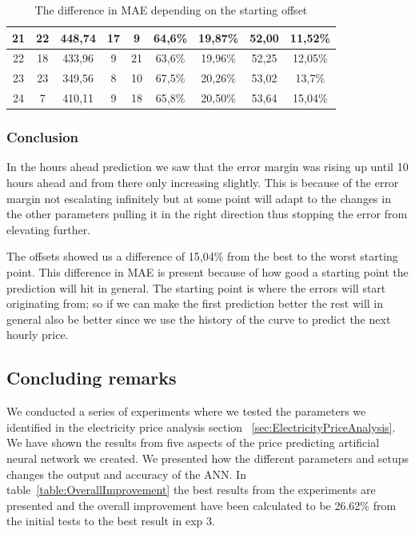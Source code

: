 \begin{table}[H]
{\begin{tabular}{|c|c|c|c|c|c|c|c|c|}
	21 & 22  & 448,74 & 17 & 9  & 64,6\% & 19,87\% & 52,00 & 11,52\% \\ \hline
	22 & 18  & 433,96 & 9  & 21 & 63,6\% & 19,96\% & 52,25 & 12,05\% \\ \hline
	23 & 23  & 349,56 & 8  & 10 & 67,5\% & 20,26\% & 53,02 & 13,7\% \\ \hline
	24 & 7   & 410,11 & 9  & 18 & 65,8\% & 20,50\% & 53,64 & 15,04\% \\ \hline
	\end{tabular}
}
\caption{The difference in MAE depending on the starting offset} %
\label{table:Offsets} %
\end{table}

\subsubsection{Conclusion}
In the hours ahead prediction we saw that the error margin was rising up until 10 hours ahead and from there only increasing slightly. This is because of the error margin not escalating infinitely but at some point will adapt to the changes in the other parameters pulling it in the right direction thus stopping the error from elevating further.

The offsets showed us a difference of 15,04\% from the best to the worst starting point. This difference in MAE is present because of how good a starting point the prediction will hit in general. The starting point is where the errors will start originating from; so if we can make the first prediction better the rest will in general also be better since we use the history of the curve to predict the next hourly price.

\newpage
\subsection{Concluding remarks}
We conducted a series of experiments where we tested the parameters we identified in the electricity price analysis section ~\ref{sec:ElectricityPriceAnalysis}. We have shown the results from five aspects of the price predicting artificial neural network we created. We presented how the different parameters and setups changes the output and accuracy of the ANN. In table~\ref{table:OverallImprovement} the best results from the experiments are presented and the overall improvement have been calculated to be 26.62\% from the initial tests to the best result in exp 3.

